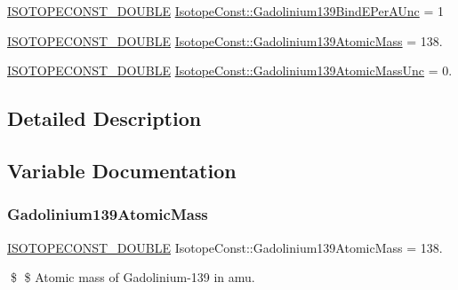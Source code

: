 \begin{DoxyCompactItemize}
\mbox{\hyperlink{group___isotope_const-_macros_ga8f45a7272ce02c0b4c65c44636ed719a}{I\+S\+O\+T\+O\+P\+E\+C\+O\+N\+S\+T\+\_\+\+D\+O\+U\+B\+LE}} \mbox{\hyperlink{group___isotope_const-_gadolinium-_gd139_ga6f13fb14d3d832667ef25beaefe080a0}{Isotope\+Const\+::\+Gadolinium139\+Bind\+E\+Per\+A\+Unc}} = 1
\item 
\mbox{\hyperlink{group___isotope_const-_macros_ga8f45a7272ce02c0b4c65c44636ed719a}{I\+S\+O\+T\+O\+P\+E\+C\+O\+N\+S\+T\+\_\+\+D\+O\+U\+B\+LE}} \mbox{\hyperlink{group___isotope_const-_gadolinium-_gd139_ga8ea46e55ae2f278b9d46185fc5851cb6}{Isotope\+Const\+::\+Gadolinium139\+Atomic\+Mass}} = 138.
\item 
\mbox{\hyperlink{group___isotope_const-_macros_ga8f45a7272ce02c0b4c65c44636ed719a}{I\+S\+O\+T\+O\+P\+E\+C\+O\+N\+S\+T\+\_\+\+D\+O\+U\+B\+LE}} \mbox{\hyperlink{group___isotope_const-_gadolinium-_gd139_ga1cddeb6536b26bf7a48652aa82b4e8fe}{Isotope\+Const\+::\+Gadolinium139\+Atomic\+Mass\+Unc}} = 0.
\end{DoxyCompactItemize}


\subsection{Detailed Description}


\subsection{Variable Documentation}
\mbox{\label{group___isotope_const-_gadolinium-_gd139_ga8ea46e55ae2f278b9d46185fc5851cb6}} 
\subsubsection{\texorpdfstring{Gadolinium139\+Atomic\+Mass}{Gadolinium139AtomicMass}}
{\footnotesize\ttfamily \mbox{\hyperlink{group___isotope_const-_macros_ga8f45a7272ce02c0b4c65c44636ed719a}{I\+S\+O\+T\+O\+P\+E\+C\+O\+N\+S\+T\+\_\+\+D\+O\+U\+B\+LE}} Isotope\+Const\+::\+Gadolinium139\+Atomic\+Mass = 138.}

\$ \$ Atomic mass of Gadolinium-\/139 in amu. \mbox{\label{group___isotope_const-_gadolinium-_gd139_ga1cddeb6536b26bf7a48652aa82b4e8fe}} 
